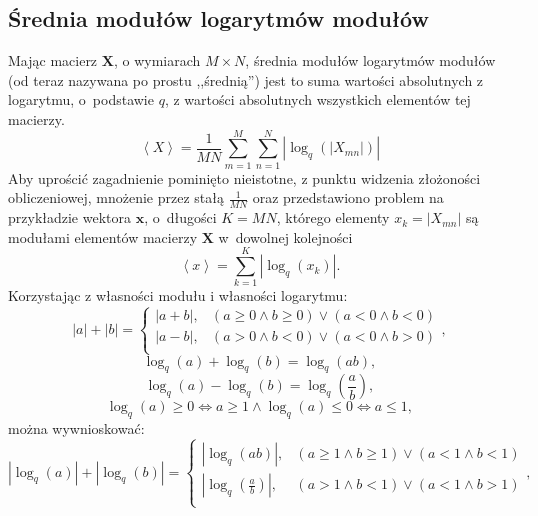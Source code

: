 \documentclass[pl,12pt]{aghdpl}
\let\Oldsubsection\subsection%
\renewcommand{\subsection}{\FloatBarrier\Oldsubsection}
\begin{document}
\subsection{Średnia modułów logarytmów modułów}
Mając macierz $\bm X$, o wymiarach $M \times N$, średnia modułów logarytmów modułów
(od teraz nazywana po prostu ,,średnią'') jest to suma wartości absolutnych z
logarytmu, o~podstawie $q$, z wartości absolutnych wszystkich elementów tej
macierzy.
\begin{equation}
  \left<X\right> =
  \frac{1}{MN}\sum_{m=1}^{M}\sum_{n=1}^{N}\left|\log_{q}\left(\left|X_{mn}\right|\right)\right|
\end{equation}
Aby uprościć zagadnienie pominięto nieistotne, z punktu widzenia złożoności
obliczeniowej, mnożenie przez stałą $\frac{1}{MN}$ oraz przedstawiono problem na przykładzie
wektora $\bm x$, o~długości $K=MN$, którego elementy $x_k = \left|X_{mn}\right|$
są modułami elementów macierzy $\bm X$ w~dowolnej kolejności
\begin{equation}\label{eq:naive_algorithm}
  \left<x\right> = \sum_{k=1}^{K}\left|\log_{q}\left(x_{k}\right)\right|.
\end{equation}
Korzystając z własności modułu i własności logarytmu:
\begin{equation}
  |a| + |b| = \begin{cases}
    |a + b|, & (a \geq 0 \land b \geq 0) \lor (a < 0 \land b < 0)\\
    |a - b|, & (a > 0 \land b < 0) \lor (a < 0 \land b > 0)\\
  \end{cases},
\end{equation}
\begin{equation}
  \log_q(a) + \log_q(b) = \log_q(ab),
\end{equation}
\begin{equation}
  \log_q(a) - \log_q(b) = \log_q\left(\frac{a}{b}\right),
\end{equation}
\begin{equation}
  \log_q(a) \geq 0 \iff a \geq 1 \land \log_q(a) \leq 0 \iff a \leq 1 ,
\end{equation}
można wywnioskować:
\begin{equation}
  |\log_q(a)| + |\log_q(b)| = \begin{cases}
    |\log_q(ab)|, & (a \geq 1 \land b \geq 1) \lor (a < 1 \land b < 1)\\
    |\log_q\left(\frac{a}{b}\right)|, & (a > 1 \land b < 1) \lor (a < 1 \land b > 1)\\
  \end{cases},
\end{equation}
\end{document}
